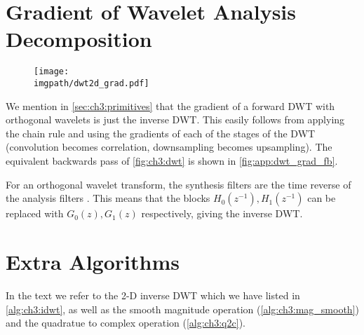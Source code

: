 \section{Gradient of Wavelet Analysis Decomposition}\label{sec:app:analysis_gradient}
\begin{figure}
  \centering
  \texttt{[image: \\imgpath/dwt2d\_grad.pdf]}
  \label{fig:app:dwt_grad_fb}
\end{figure}
We mention in \autoref{sec:ch3:primitives} that the gradient of a forward DWT with
orthogonal wavelets is just the inverse DWT. 
This easily follows from applying the chain rule and using the gradients of each of the
stages of the DWT (convolution becomes correlation, downsampling becomes
upsampling). The equivalent backwards pass of \autoref{fig:ch3:dwt} is
shown in \autoref{fig:app:dwt_grad_fb}.

For an orthogonal wavelet transform, the synthesis filters are the time reverse of
the analysis filters \cite[Chapter 3]{vetterli_wavelets_2007}. This means that
the blocks $H_0(z^{-1}), H_1(z^{-1})$ can be replaced with $G_0(z), G_1(z)$
respectively, giving the inverse DWT.

\section{Extra Algorithms}
In the text we refer to the 2-D inverse DWT which we have listed in
\autoref{alg:ch3:idwt}, as well as the smooth magnitude operation
(\autoref{alg:ch3:mag_smooth}) and the quadratue to complex operation
(\autoref{alg:ch3:q2c}).

